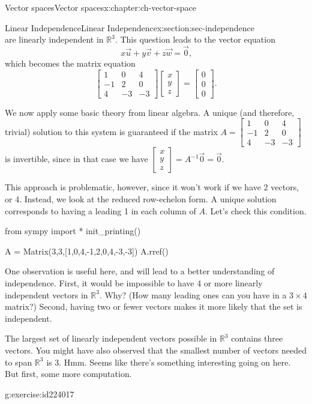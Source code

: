 \documentclass[oneside,10pt,]{book}
\numberwithin{equation}{section}
\newcommand{\bbm}{\begin{bmatrix}}
\newcommand{\ebm}{\end{bmatrix}}
\newcommand{\amp}{&}
\begin{document}
\begin{chapterptx}{Vector spaces}{}{Vector spaces}{}{}{x:chapter:ch-vector-space}
\begin{sectionptx}{Linear Independence}{}{Linear Independence}{}{}{x:section:sec-independence}
\begin{equation*}
\end{equation*}
are linearly independent in \(\mathbb{R}^3\). This question leads to the vector equation%
\begin{equation*}
x\vec{u}+y\vec{v}+z\vec{w}=\vec{0}\text{,}
\end{equation*}
which becomes the matrix equation%
\begin{equation*}
\bbm 1\amp0\amp4\\-1\amp2\amp0\\4\amp-3\amp-3\ebm\bbm x\\y\\z\ebm = \bbm 0\\0\\0\ebm\text{.}
\end{equation*}
%
\par
We now apply some basic theory from linear algebra. A unique (and therefore, trivial) solution to this system is guaranteed if the matrix \(A = \bbm 1\amp0\amp4\\-1\amp2\amp0\\4\amp-3\amp-3\ebm\) is invertible, since in that case we have \(\bbm x\\y\\z\ebm = A^{-1}\vec{0} = \vec{0}\).%
\par
This approach is problematic, however, since it won't work if we have 2 vectors, or 4. Instead, we look at the reduced row-echelon form. A unique solution corresponds to having a leading 1 in each column of \(A\). Let's check this condition.%
\begin{sageinput}
from sympy import *
init_printing()
\end{sageinput}
\begin{sageinput}
A = Matrix(3,3,[1,0,4,-1,2,0,4,-3,-3])
A.rref()
\end{sageinput}
One observation is useful here, and will lead to a better understanding of independence. First, it would be impossible to have 4 or more linearly independent vectors in \(\mathbb{R}^3\). Why? (How many leading ones can you have in a \(3\times 4\) matrix?) Second, having two or fewer vectors makes it more likely that the set is independent.%
\par
The largest set of linearly independent vectors possible in \(\mathbb{R}^3\) contains three vectors. You might have also observed that the smallest number of vectors needed to span \(\mathbb{R}^3\) is 3. Hmm. Seems like there's something interesting going on here. But first, some more computation.%
\begin{inlineexercise}{}{g:exercise:id224017}%

\end{inlineexercise}
\end{sectionptx}
\end{chapterptx}
\end{document}
